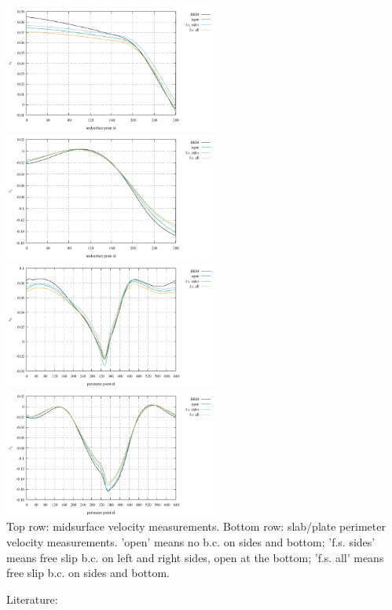 \begin{center}
\includegraphics[width=7cm]{python_codes/fieldstone_55/images/u_midsurface}
\includegraphics[width=7cm]{python_codes/fieldstone_55/images/v_midsurface}\\
\includegraphics[width=7cm]{python_codes/fieldstone_55/images/u_perimeter}
\includegraphics[width=7cm]{python_codes/fieldstone_55/images/v_perimeter}\\
{\scriptsize Top row: midsurface velocity measurements. Bottom row: slab/plate perimeter 
velocity measurements. 'open' means no b.c. on sides and bottom; 'f.s. sides' means 
free slip b.c. on left and right sides, open at the bottom; 'f.s. all' means 
free slip b.c. on sides and bottom.}
\end{center}




Literature: \cite{fogm14}
